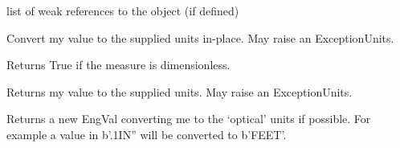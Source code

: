 \documentclass[letterpaper,10pt,english]{sphinxmanual}
\begin{document}
\begin{fulllineitems}
\begin{fulllineitems}
\end{fulllineitems}


\begin{fulllineitems}
\label{\detokenize{ref/LIS/core/EngVal:TotalDepth.LIS.core.EngVal.EngVal.__weakref__}}
list of weak references to the object (if defined)

\end{fulllineitems}


\begin{fulllineitems}
\label{\detokenize{ref/LIS/core/EngVal:TotalDepth.LIS.core.EngVal.EngVal.convert}}
Convert my value to the supplied units in-place. May raise an ExceptionUnits.

\end{fulllineitems}


\begin{fulllineitems}
\label{\detokenize{ref/LIS/core/EngVal:TotalDepth.LIS.core.EngVal.EngVal.dimensionless}}
Returns True if the measure is dimensionless.

\end{fulllineitems}


\begin{fulllineitems}
\label{\detokenize{ref/LIS/core/EngVal:TotalDepth.LIS.core.EngVal.EngVal.getInUnits}}
Returns my value to the supplied units. May raise an ExceptionUnits.

\end{fulllineitems}


\begin{fulllineitems}
\label{\detokenize{ref/LIS/core/EngVal:TotalDepth.LIS.core.EngVal.EngVal.newEngValInOpticalUnits}}
Returns a new EngVal converting me to the ‘optical’ units if possible.
For example a value in b’.1IN” will be converted to b’FEET’.


\end{fulllineitems}
\end{fulllineitems}
\end{document}
